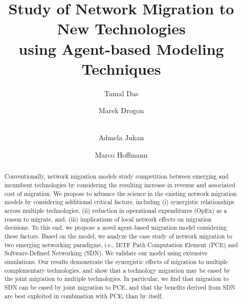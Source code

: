 \documentclass[smallextended]{svjour3}
\begin{document}
\title{Study of Network Migration to New Technologies \\ using Agent-based Modeling Techniques}

\author{Tamal Das \and Marek Drogon \and \\ Admela Jukan \and Marco Hoffmann}


\maketitle

\begin{abstract} Conventionally, network migration models study competition
between emerging and incumbent technologies by considering the resulting
increase in revenue and associated cost of migration.
We propose to advance the science in the existing network migration models by
considering additional critical factors, including (i) synergistic relationships
across multiple technologies, (ii) reduction in operational expenditures (OpEx)
as a reason to migrate, and, (iii) implications of local network effects on
migration decisions. To this end, we propose a novel agent-based migration model
considering these factors. Based on the model, we analyze the case study of
network migration to two emerging networking paradigms, i.e., IETF Path
Computation Element (PCE) and Software-Defined Networking (SDN). We validate our
model using extensive simulations. Our results demonstrate the synergistic
effects of migration to multiple complementary technologies, and show that a
technology migration may be eased by the joint migration to multiple
technologies. In particular, we find that migration to SDN can be eased by joint
migration to PCE, and that the benefits derived from SDN are best exploited in
combination with PCE, than by itself.

\end{abstract}
\end{document}
